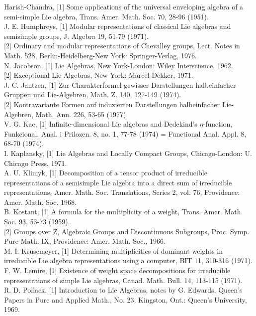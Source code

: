 \documentclass[10pt]{article}
\begin{document}
Harish-Chandra, [1] Some applications of the universal enveloping algebra of a semi-simple Lie algebra, Trans. Amer. Math. Soc. 70, 28-96 (1951).\\[0pt]
J. E. Humphreys, [1] Modular representations of classical Lie algebras and semisimple groups, J. Algebra 19, 51-79 (1971).\\[0pt]
[2] Ordinary and modular representations of Chevalley groups, Lect. Notes in Math. 528, Berlin-Heidelberg-New York: Springer-Verlag, 1976.\\[0pt]
N. Jacobson, [1] Lie Algebras, New York-London: Wiley Interscience, 1962.\\[0pt]
[2] Exceptional Lie Algebras, New York: Marcel Dekker, 1971.\\[0pt]
J. C. Jantzen, [1] Zur Charakterformel gewisser Darstellungen halbeinfacher Gruppen und Lie-Algebren, Math. Z. 140, 127-149 (1974).\\[0pt]
[2] Kontravariante Formen auf induzierten Darstellungen halbeinfacher Lie-Algebren, Math. Ann. 226, 53-65 (1977).\\[0pt]
V. G. Kac, [1] Infinite-dimensional Lie algebras and Dedekind's $\eta$-function, Funkcional. Anal. i Prilozen. 8, no. 1, 77-78 (1974) = Functional Anal. Appl. 8, 68-70 (1974).\\[0pt]
I. Kaplansky, [1] Lie Algebras and Locally Compact Groups, Chicago-London: U. Chicago Press, 1971.\\[0pt]
A. U. Klimyk, [1] Decomposition of a tensor product of irreducible representations of a semisimple Lie algebra into a direct sum of irreducible representations, Amer. Math. Soc. Translations, Series 2, vol. 76, Providence: Amer. Math. Soc. 1968.\\[0pt]
B. Kostant, [1] A formula for the multiplicity of a weight, Trans. Amer. Math. Soc. 93, 53-73 (1959).\\[0pt]
[2] Groups over Z, Algebraic Groups and Discontinuous Subgroups, Proc. Symp. Pure Math. IX, Providence: Amer. Math. Soc., 1966.\\[0pt]
M. I. Krusemeyer, [1] Determining multiplicities of dominant weights in irreducible Lie algebra representations using a computer, BIT 11, 310-316 (1971).\\[0pt]
F. W. Lemire, [1] Existence of weight space decompositions for irreducible representations of simple Lie algebras, Canad. Math. Bull. 14, 113-115 (1971).\\[0pt]
R. D. Pollack, [1] Introduction to Lie Algebras, notes by G. Edwards, Queen's Papers in Pure and Applied Math., No. 23, Kingston, Ont.: Queen's University, 1969.\\[0pt]
\end{document}
